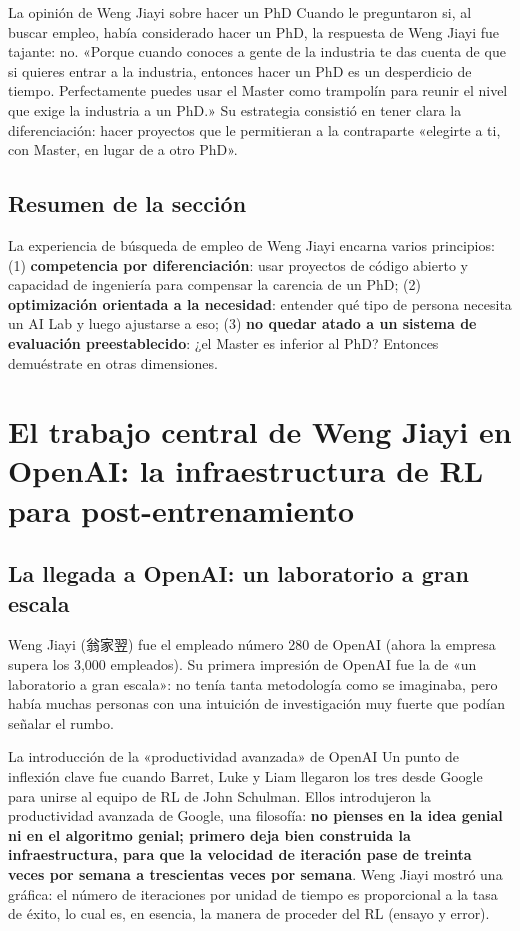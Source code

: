 \documentclass[a4paper]{article}
\begin{document}
\begin{knowledgebox}{La opinión de Weng Jiayi sobre hacer un PhD}
Cuando le preguntaron si, al buscar empleo, había considerado hacer un PhD, la respuesta de Weng Jiayi fue tajante: no. «Porque cuando conoces a gente de la industria te das cuenta de que si quieres entrar a la industria, entonces hacer un PhD es un desperdicio de tiempo. Perfectamente puedes usar el Master como trampolín para reunir el nivel que exige la industria a un PhD.» Su estrategia consistió en tener clara la diferenciación: hacer proyectos que le permitieran a la contraparte «elegirte a ti, con Master, en lugar de a otro PhD».
\end{knowledgebox}

\subsection{Resumen de la sección}

La experiencia de búsqueda de empleo de Weng Jiayi encarna varios principios: (1) \textbf{competencia por diferenciación}: usar proyectos de código abierto y capacidad de ingeniería para compensar la carencia de un PhD; (2) \textbf{optimización orientada a la necesidad}: entender qué tipo de persona necesita un AI Lab y luego ajustarse a eso; (3) \textbf{no quedar atado a un sistema de evaluación preestablecido}: ¿el Master es inferior al PhD? Entonces demuéstrate en otras dimensiones.

\section{El trabajo central de Weng Jiayi en OpenAI: la infraestructura de RL para post-entrenamiento}

\subsection{La llegada a OpenAI: un laboratorio a gran escala}

Weng Jiayi (翁家翌) fue el empleado número 280 de OpenAI (ahora la empresa supera los 3,000 empleados). Su primera impresión de OpenAI fue la de «un laboratorio a gran escala»: no tenía tanta metodología como se imaginaba, pero había muchas personas con una intuición de investigación muy fuerte que podían señalar el rumbo.

\begin{importantbox}{La introducción de la «productividad avanzada» de OpenAI}
Un punto de inflexión clave fue cuando Barret, Luke y Liam llegaron los tres desde Google para unirse al equipo de RL de John Schulman. Ellos introdujeron la productividad avanzada de Google, una filosofía: \textbf{no pienses en la idea genial ni en el algoritmo genial; primero deja bien construida la infraestructura, para que la velocidad de iteración pase de treinta veces por semana a trescientas veces por semana}. Weng Jiayi mostró una gráfica: el número de iteraciones por unidad de tiempo es proporcional a la tasa de éxito, lo cual es, en esencia, la manera de proceder del RL (ensayo y error).
\end{importantbox}
\end{document}
